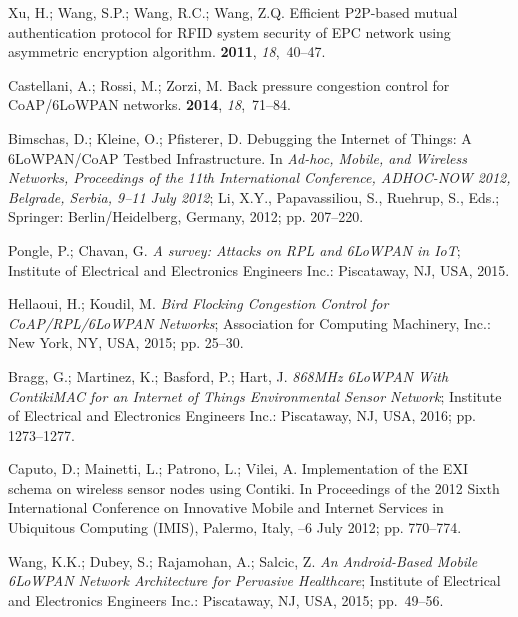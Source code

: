 \documentclass[symmetry,article,accept,moreauthors,pdftex10pt,a4paper]{mdpi}
\begin{document}
\begin{thebibliography}{999}
Xu, H.; Wang, S.P.; Wang, R.C.; Wang, Z.Q.
\newblock Efficient P2P-based mutual authentication protocol for RFID system
security of EPC network using asymmetric encryption algorithm.
{\bf 2011}, {\em 18},~40--47.

Castellani, A.; Rossi, M.; Zorzi, M.
\newblock Back pressure congestion control for CoAP/6LoWPAN networks.
 {\bf 2014}, {\em 18},~71--84.

Bimschas, D.; Kleine, O.; Pfisterer, D. Debugging the Internet of Things: A
6LoWPAN/CoAP Testbed Infrastructure.
\newblock In {\em Ad-hoc, Mobile, and Wireless Networks, Proceedings of the 11th International
	Conference, ADHOC-NOW 2012, Belgrade, Serbia, 9--11 July 2012};
Li, X.Y., Papavassiliou, S., Ruehrup, S., Eds.; Springer: Berlin/Heidelberg, Germany, 2012; pp. 207--220.

Pongle, P.; Chavan, G.
\newblock \emph{A survey: Attacks on RPL and 6LoWPAN in IoT};
\newblock Institute of Electrical and Electronics Engineers Inc.: Piscataway, NJ, USA, 2015.

Hellaoui, H.; Koudil, M.
\newblock \emph{Bird Flocking Congestion Control for CoAP/RPL/6LoWPAN Networks};
\newblock Association for Computing Machinery, Inc.: New York, NY, USA, 2015; pp. 25--30.

Bragg, G.; Martinez, K.; Basford, P.; Hart, J.
\newblock \emph{868MHz 6LoWPAN With ContikiMAC for an Internet of Things
	Environmental Sensor Network};
\newblock Institute of Electrical and Electronics Engineers Inc.: Piscataway, NJ, USA, 2016; pp.
1273--1277.

Caputo, D.; Mainetti, L.; Patrono, L.; Vilei, A.
\newblock Implementation of the EXI schema on wireless sensor nodes using
Contiki. In Proceedings of the 2012 Sixth International Conference on  Innovative Mobile and Internet Services in Ubiquitous Computing (IMIS), Palermo, Italy,
--6 July 2012; pp. 770--774.

Wang, K.K.; Dubey, S.; Rajamohan, A.; Salcic, Z.
\newblock \emph{An Android-Based Mobile 6LoWPAN Network Architecture for Pervasive
	Healthcare};
\newblock Institute of Electrical and Electronics Engineers Inc.: Piscataway, NJ, USA, 2015; pp.~49--56.


\end{thebibliography}
\end{document}
